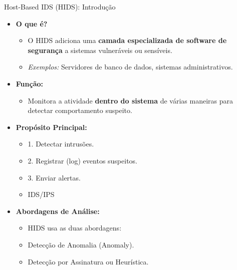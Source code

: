 \begin{frame}{Host-Based IDS (HIDS): Introdução}
    \begin{itemize}
        \item \textbf{O que é?}
              \begin{itemize}
                  \item O HIDS adiciona uma \textbf{camada especializada de software de segurança} a sistemas vulneráveis ou sensíveis.
                  \item \textit{Exemplos:} Servidores de banco de dados, sistemas administrativos.
              \end{itemize}

        \item \textbf{Função:}
              \begin{itemize}
                  \item Monitora a atividade \textbf{dentro do sistema} de várias maneiras para detectar comportamento suspeito.
              \end{itemize}

        \item \textbf{Propósito Principal:}
              \begin{itemize}
                  \item 1. Detectar intrusões.
                  \item 2. Registrar (log) eventos suspeitos.
                  \item 3. Enviar alertas.
                  \item IDS/IPS
              \end{itemize}


        \item \textbf{Abordagens de Análise:}
              \begin{itemize}
                  \item HIDS usa as duas abordagens:
                  \item Detecção de Anomalia (Anomaly).
                  \item Detecção por Assinatura ou Heurística.
              \end{itemize}
    \end{itemize}
\end{frame}

